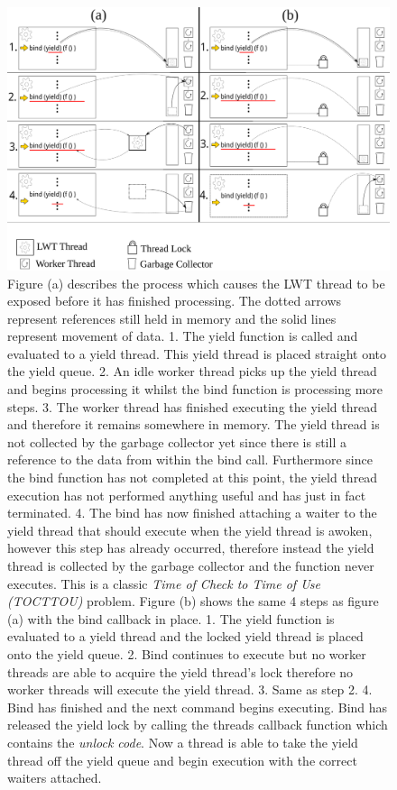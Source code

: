 \documentclass[12pt,twoside,notitlepage]{report}
\begin{document}
\begin{figure}[h!]
\includegraphics[width=\linewidth]{bind_callback}
\caption[Bind Callback diagram]{Figure (a) describes the process which causes the LWT thread to be exposed before it has finished processing. The dotted arrows represent references still held in memory and the solid lines represent movement of data. 1. The
yield function is called and evaluated to a yield thread. This yield thread is placed straight onto the yield queue. 2. An idle worker thread picks up the yield thread and begins processing it whilst the bind function is processing
more steps. 3. The worker thread has finished executing the yield thread and therefore it remains somewhere in memory. The yield thread is not collected by the garbage collector yet since there is still a reference to the data from
within the bind call. Furthermore since the bind function has not completed at this point, the yield thread execution has not performed anything useful and has just in fact terminated. 4. The bind has now finished attaching a waiter to
the yield thread that should execute when the yield thread is awoken, however this step has already occurred, therefore instead the yield thread is collected by the garbage collector and the function never executes. This is a classic
{\em Time of Check to Time of Use (TOCTTOU)} problem. Figure (b) shows the same 4 steps as figure (a) with the bind callback in place. 1. The yield function is evaluated to a yield thread and the locked yield thread is placed onto the
yield queue. 2. Bind continues to execute but no worker threads are able to acquire the yield thread's lock therefore no worker threads will execute the yield thread. 3. Same as step 2. 4. Bind has finished and the next command begins
executing. Bind has released the yield lock by calling the threads callback function which contains the {\em unlock code}. Now a thread is able to take the yield thread off the yield queue and begin execution with the correct waiters
attached.}

\label{fig:bind_callback}
\end{figure}
\end{document}
